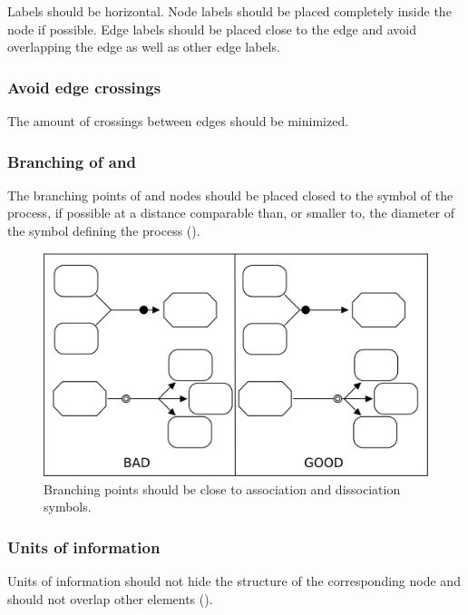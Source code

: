 Labels should be horizontal. Node labels should be placed completely
inside the node if possible. Edge labels should be placed close to
the edge and avoid overlapping the edge as well as other edge
labels.

\subsubsection{Avoid edge crossings}

The amount of crossings between edges should be minimized.

\subsubsection{Branching of  and }

The branching points of  and  nodes should be placed closed to the symbol of the process, if possible at a distance comparable than, or smaller to, the diameter of the symbol defining the process ().

\begin{figure}[h!]
  \centering
  \includegraphics[scale=0.3]{images/layout-branching}
  \caption{Branching points should be close to association and dissociation symbols.}\label{fig:branching}
\end{figure}

\subsubsection{Units of information}

Units of information should not hide the structure of the
corresponding node and should not overlap other
elements ().

